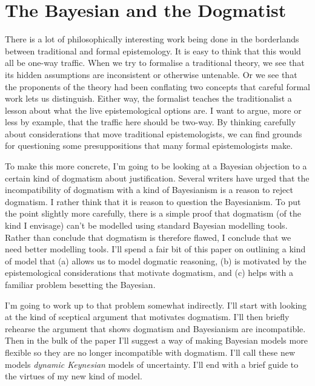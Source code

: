 \chapter{The Bayesian and the Dogmatist}


There is a lot of philosophically interesting work being done in the borderlands between traditional and formal epistemology. It is easy to think that this would all be one-way traffic. When we try to formalise a traditional theory, we see that its hidden assumptions are inconsistent or otherwise untenable. Or we see that the proponents of the theory had been conflating two concepts that careful formal work lets us distinguish. Either way, the formalist teaches the traditionalist a lesson about what the live epistemological options are. I want to argue, more or less by example, that the traffic here should be two-way. By thinking carefully about considerations that move traditional epistemologists, we can find grounds for questioning some presuppositions that many formal epistemologists make.

To make this more concrete, I'm going to be looking at a Bayesian objection to a certain kind of dogmatism about justification. Several writers have urged that the incompatibility of dogmatism with a kind of Bayesianism is a reason to reject dogmatism. I rather think that it is reason to question the Bayesianism. To put the point slightly more carefully, there is a simple proof that dogmatism (of the kind I envisage) can't be modelled using standard Bayesian modelling tools. Rather than conclude that dogmatism is therefore flawed, I conclude that we need better modelling tools. I'll spend a fair bit of this paper on outlining a kind of model that (a) allows us to model dogmatic reasoning, (b) is motivated by the epistemological considerations that motivate dogmatism, and (c) helps with a familiar problem besetting the Bayesian.

I'm going to work up to that problem somewhat indirectly. I'll start with looking at the kind of sceptical argument that motivates dogmatism. I'll then briefly rehearse the argument that shows dogmatism and Bayesianism are incompatible. Then in the bulk of the paper I'll suggest a way of making Bayesian models more flexible so they are no longer incompatible with dogmatism. I'll call these new models \textit{dynamic Keynesian} models of uncertainty. I'll end with a brief guide to the virtues of my new kind of model.


